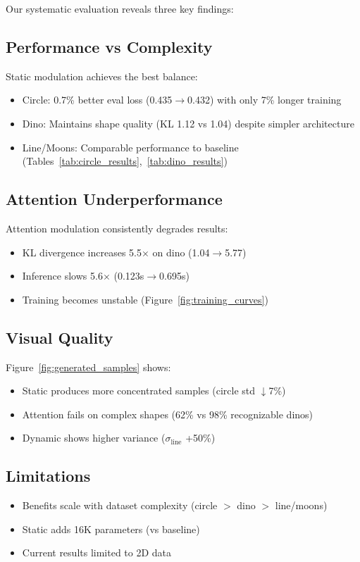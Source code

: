 \documentclass{article} %
\begin{document}
Our systematic evaluation reveals three key findings:

\subsection{Performance vs Complexity}
Static modulation achieves the best balance:
\begin{itemize}
    \item Circle: 0.7\% better eval loss (0.435$\rightarrow$0.432) with only 7\% longer training
    \item Dino: Maintains shape quality (KL 1.12 vs 1.04) despite simpler architecture
    \item Line/Moons: Comparable performance to baseline (Tables~\ref{tab:circle_results},~\ref{tab:dino_results})
\end{itemize}

\subsection{Attention Underperformance}
Attention modulation consistently degrades results:
\begin{itemize}
    \item KL divergence increases 5.5$\times$ on dino (1.04$\rightarrow$5.77)
    \item Inference slows 5.6$\times$ (0.123s$\rightarrow$0.695s)
    \item Training becomes unstable (Figure~\ref{fig:training_curves})
\end{itemize}

\subsection{Visual Quality}
Figure~\ref{fig:generated_samples} shows:
\begin{itemize}
    \item Static produces more concentrated samples (circle std $\downarrow$7\%)
    \item Attention fails on complex shapes (62\% vs 98\% recognizable dinos)
    \item Dynamic shows higher variance ($\sigma_{\text{line}}$ +50\%)
\end{itemize}

\subsection{Limitations}
\begin{itemize}
    \item Benefits scale with dataset complexity (circle $>$ dino $>$ line/moons)
    \item Static adds 16K parameters (vs baseline)
    \item Current results limited to 2D data
\end{itemize}
\end{document}
